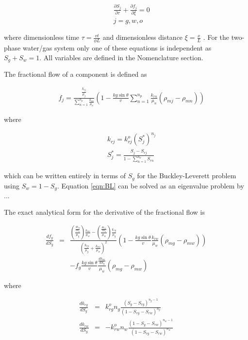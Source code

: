 \begin{eqnarray}
&&\frac{{\partial S_j }}{{\partial \tau }} +  \frac{{\partial f_j }}{{\partial \xi }}  = 0 \label{eqn:BL}\\
&&j = g,w,o \nonumber
\end{eqnarray}

\noindent where dimensionless time $\tau = \frac{v t}{\phi L}$ and dimensionless distance $\xi = \frac{x}{L}$ .  For the two-phase water/gas system only one of these equations is independent as $S_g + S_w = 1$.  All variables are defined in the Nomenclature section.

The fractional flow of a component is defined as

\begin{eqnarray}
&&f_j = \frac{\frac{k_{rj}}{\mu_j}}{\sum_{n=1}^{n_p}{\frac{k_{rn}}{\mu_n}}} \left( 1-\frac{kg \sin \theta}{v} \sum_{n=1}^{n_p}{\frac{k_{rn}}{\mu_n}\left( \rho_{mj}-\rho_{mn} \right)} \right) \label{eqn:ff}
\end{eqnarray}

\noindent where

\begin{eqnarray}
&&k_{rj} = k_{rj}^o {\left(S_j^*\right)^{n_j}}\\
&&S_j^* = \frac{S_j - S_{rj}}{1-\sum_{n=1}^{n_p}{S_{rn}}} \nonumber
\end{eqnarray}

\noindent which can be written entirely in terms of $S_g$ for the Buckley-Leverett problem using $S_w = 1-S_g$.  Equation \ref{eqn:BL} can be solved as an eigenvalue problem by ...

The exact analytical form for the derivative of the fractional flow is

\begin{eqnarray}
\frac{df_g}{dS_g}&=& \frac{\left(\frac{\frac{d k_{rg}}{d S_g}}{\mu_g}\right) \frac{k_{rw}}{\mu_w}-\left(\frac{\frac{d k_{rw}}{d S_g}}{\mu_w}\right)\frac{k_{rg}}{\mu_g}}{\left(\frac{k_{rg}}{\mu_g}+\frac{k_{rw}}{\mu_w}\right)^2}\left( 1-\frac{kg \sin \theta}{v} \frac{k_{rw}}{\mu_w}\left( \rho_{mg}-\rho_{mw} \right) \right)\nonumber \\
&&-f_g\frac{kg \sin \theta}{v} \frac{\frac{d k_{rw}}{d S_g}}{\mu_w}\left(\rho_{mg}-\rho_{mw} \right)
\end{eqnarray}

\noindent where

\begin{eqnarray}
\frac{d k_{rg}}{d S_g} &=& k_{rg}^o n_g \frac{\left(S_g - S_{rg}\right)^{n_g-1}}{\left(1-S_{rg}-S_{rw}\right)^{n_g}}\nonumber \\
\frac{d k_{rw}}{d S_g}&=& -k_{rw}^o n_w \frac{\left(1-S_g - S_{rw}\right)^{n_w-1}}{\left(1-S_{rg}-S_{rw}\right)^{n_w}}\nonumber
\end{eqnarray}



